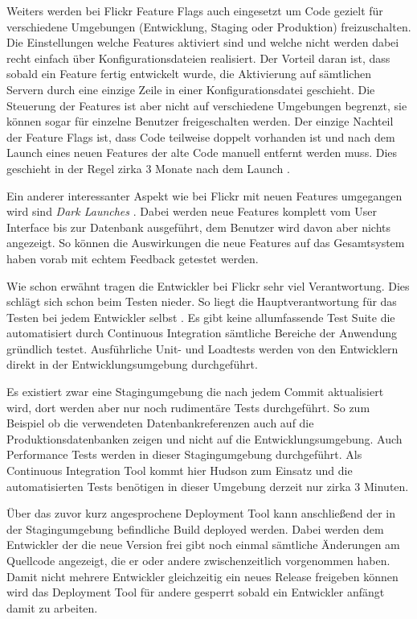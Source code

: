 Weiters werden bei Flickr Feature Flags auch eingesetzt um Code gezielt für
verschiedene Umgebungen (Entwicklung, Staging oder Produktion) freizuschalten.
Die Einstellungen welche Features aktiviert sind und welche nicht werden dabei
recht einfach über Konfigurationsdateien realisiert. Der Vorteil daran ist,
dass sobald ein Feature fertig entwickelt wurde, die Aktivierung auf
sämtlichen Servern durch eine einzige Zeile in einer Konfigurationsdatei
geschieht. Die Steuerung der Features ist aber nicht auf verschiedene
Umgebungen begrenzt, sie können sogar für einzelne Benutzer freigeschalten
werden. Der einzige Nachteil der Feature Flags ist, dass Code teilweise 
doppelt vorhanden ist und nach dem Launch eines neuen Features der alte Code
manuell entfernt werden muss. Dies geschieht in der Regel zirka 3 Monate nach
dem Launch \cite{flickr11}.

Ein anderer interessanter Aspekt wie bei Flickr mit neuen Features umgegangen
wird sind \emph{Dark Launches} \cite{flickr11}. Dabei werden neue Features
komplett vom User Interface bis zur Datenbank ausgeführt, dem Benutzer wird
davon aber nichts angezeigt. So können die Auswirkungen die neue Features auf
das Gesamtsystem haben vorab mit echtem Feedback getestet werden.

Wie schon erwähnt tragen die Entwickler bei Flickr sehr viel Verantwortung.
Dies schlägt sich schon beim Testen nieder. So liegt die Hauptverantwortung
für das Testen bei jedem Entwickler selbst \cite{flickr11}. Es gibt keine
allumfassende Test Suite die automatisiert durch Continuous Integration
sämtliche Bereiche der Anwendung gründlich testet. Ausführliche Unit- und
Loadtests werden von den Entwicklern direkt in der Entwicklungsumgebung
durchgeführt.

Es existiert zwar eine Stagingumgebung die nach jedem Commit aktualisiert
wird, dort werden aber nur noch rudimentäre Tests durchgeführt. So zum
Beispiel ob die verwendeten Datenbankreferenzen auch auf die
Produktionsdatenbanken zeigen und nicht auf die Entwicklungsumgebung. Auch
Performance Tests werden in dieser Stagingumgebung durchgeführt. Als
Continuous Integration Tool kommt hier Hudson zum Einsatz und die
automatisierten Tests benötigen in dieser Umgebung derzeit nur zirka 3
Minuten.

Über das zuvor kurz angesprochene Deployment Tool kann anschließend der in der
Stagingumgebung befindliche Build deployed werden. Dabei werden dem Entwickler
der die neue Version frei gibt noch einmal sämtliche Änderungen am Quellcode
angezeigt, die er oder andere zwischenzeitlich vorgenommen haben. Damit nicht
mehrere Entwickler gleichzeitig ein neues Release freigeben können wird das
Deployment Tool für andere gesperrt sobald ein Entwickler anfängt damit zu
arbeiten.

